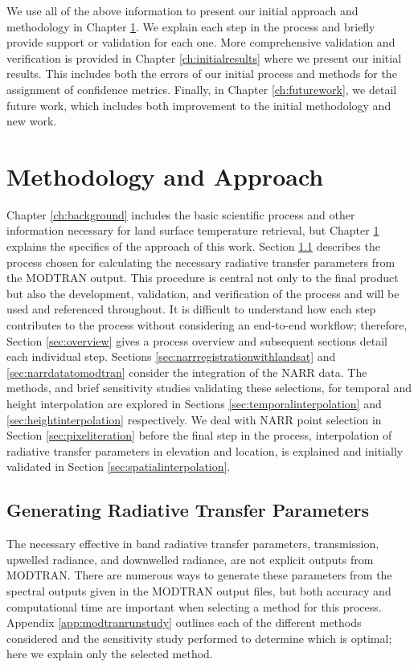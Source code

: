 \documentclass{book}
\begin{document}
We use all of the above information to present our initial approach and methodology in Chapter \ref{ch:methodology}.  We explain each step in the process and briefly provide support or validation for each one.  More comprehensive validation and verification is provided in Chapter \ref{ch:initialresults} where we present our initial results.  This includes both the errors of our initial process and methods for the assignment of confidence metrics.  Finally, in Chapter \ref{ch:futurework}, we detail future work, which includes both improvement to the initial methodology and new work.

\chapter{Methodology and Approach}
\label{ch:methodology}

Chapter \ref{ch:background} includes the basic scientific process and other information necessary for land surface temperature retrieval, but Chapter \ref{ch:methodology} explains the specifics of the approach of this work.  Section \ref{sec:parameters} describes the process chosen for calculating the necessary radiative transfer parameters from the MODTRAN output.  This procedure is central not only to the final product but also the development, validation, and verification of the process and will be used and referenced throughout.  It is difficult to understand how each step contributes to the process without considering an end-to-end workflow; therefore, Section \ref{sec:overview} gives a process overview and subsequent sections detail each individual step.  Sections \ref{sec:narrregistrationwithlandsat} and \ref{sec:narrdatatomodtran} consider the integration of the NARR data.  The methods, and brief sensitivity studies validating these selections, for temporal and height interpolation are explored in Sections \ref{sec:temporalinterpolation} and \ref{sec:heightinterpolation} respectively.  We deal with NARR point selection in Section \ref{sec:pixeliteration} before the final step in the process, interpolation of radiative transfer parameters in elevation and location, is explained and initially validated in Section \ref{sec:spatialinterpolation}.

\section{Generating Radiative Transfer Parameters}
\label{sec:parameters}

The necessary effective in band radiative transfer parameters, transmission, upwelled radiance, and downwelled radiance, are not explicit outputs from MODTRAN.  There are numerous ways to generate these parameters from the spectral outputs given in the MODTRAN output files, but both accuracy and computational time are important when selecting a method for this process.  Appendix \ref{app:modtranrunstudy} outlines each of the different methods considered and the sensitivity study performed to determine which is optimal; here we explain only the selected method.
\end{document}
